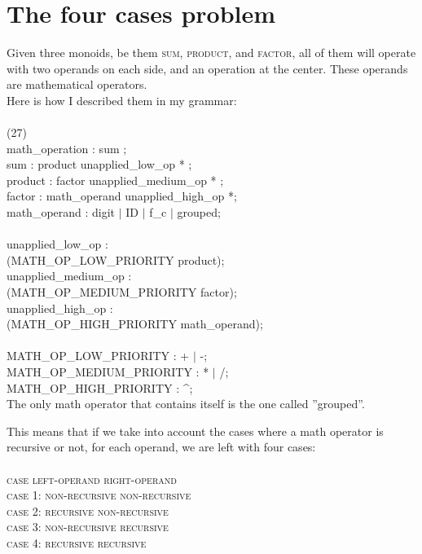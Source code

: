 \documentclass[twocolumn,10ptr]{article}
\begin{document}
	\section{The four cases problem}
	Given three monoids, be them\textsc{ sum}, \textsc{product}, and \textsc{factor}, all of them will operate with two operands on each side, and an operation at the center.	
	These operands are mathematical operators.
	\\Here is how I described them in my grammar: \\ \\
	(27)\\
	math\_operation   : sum ;\\	
	sum   : product unapplied\_low\_op * ;\\
	product   : factor unapplied\_medium\_op * ;\\ 
	factor   : math\_operand unapplied\_high\_op *; \\
	math\_operand   : digit \(\mid\)  ID \(\mid\) f\_c \(\mid\)  grouped; \\ \\
	unapplied\_low\_op : \\ (MATH\_OP\_LOW\_PRIORITY product);\\
	unapplied\_medium\_op : \\ (MATH\_OP\_MEDIUM\_PRIORITY factor);\\
	unapplied\_high\_op : \\ (MATH\_OP\_HIGH\_PRIORITY math\_operand);\\ \\
	MATH\_OP\_LOW\_PRIORITY : \textsc{}+\textsc{} \(\mid\) \textsc{}-\textsc{}; \\
	MATH\_OP\_MEDIUM\_PRIORITY : \textsc{}*\textsc{} \(\mid\) \textsc{}/\textsc{}; \\
	MATH\_OP\_HIGH\_PRIORITY : \textsc{}\string^\textsc{}; \\
	
	The only math operator that contains itself is the one called ''grouped''.
	
	This means that if we take into account the cases where a math operator is recursive or not, for each operand, we are left with four cases: \\  \\
	\textsc{case \hspace{5mm}      left-operand  \hspace{5mm}   right-operand } \\
	\textsc{ case 1:     non-recursive  \hspace{5mm}   non-recursive } \\
	\textsc{ case 2:     recursive         \hspace{13mm}   non-recursive } \\
	\textsc{ case 3:     non-recursive \hspace{5mm}    recursive } \\
	\textsc{ case 4:     recursive         \hspace{13mm}   recursive} \\
	
\end{document}
